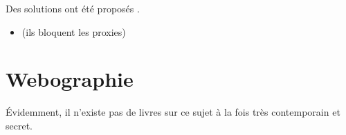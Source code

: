 \documentclass[a4paper]{article}
\begin{document}
Des solutions ont été proposés 
. 


\begin{itemize}
\item (ils bloquent les proxies)
\end{itemize}

\section{Webographie}

Évidemment, il n'existe pas de livres sur ce sujet à la fois très contemporain et secret.
\end{document}
